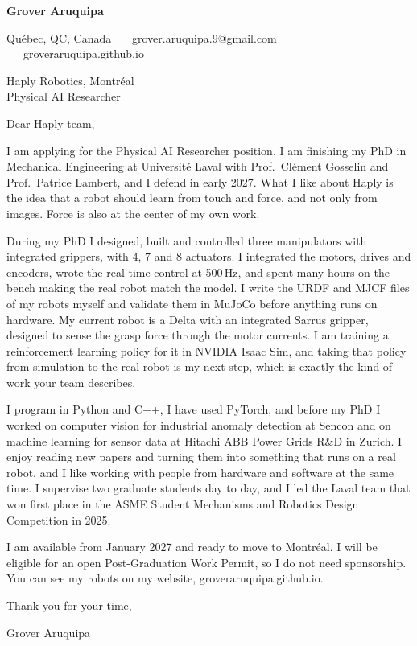 \documentclass[11pt,letterpaper]{article}
\begin{document}
{\large\bfseries Grover Aruquipa}\par\vspace{-6pt}
{\small Qu\'ebec, QC, Canada \ \textbullet\ \ grover.aruquipa.9@gmail.com \ \textbullet\ \ groveraruquipa.github.io}

\vspace{4pt}
Haply Robotics, Montr\'eal\\
Physical AI Researcher

Dear Haply team,

I am applying for the Physical AI Researcher position. I am finishing my PhD in Mechanical Engineering at Universit\'e Laval with Prof.\ Cl\'ement Gosselin and Prof.\ Patrice Lambert, and I defend in early 2027. What I like about Haply is the idea that a robot should learn from touch and force, and not only from images. Force is also at the center of my own work.

During my PhD I designed, built and controlled three manipulators with integrated grippers, with 4, 7 and 8 actuators. I integrated the motors, drives and encoders, wrote the real-time control at 500\,Hz, and spent many hours on the bench making the real robot match the model. I write the URDF and MJCF files of my robots myself and validate them in MuJoCo before anything runs on hardware. My current robot is a Delta with an integrated Sarrus gripper, designed to sense the grasp force through the motor currents. I am training a reinforcement learning policy for it in NVIDIA Isaac Sim, and taking that policy from simulation to the real robot is my next step, which is exactly the kind of work your team describes.

I program in Python and C++, I have used PyTorch, and before my PhD I worked on computer vision for industrial anomaly detection at Sencon and on machine learning for sensor data at Hitachi ABB Power Grids R\&D in Zurich. I enjoy reading new papers and turning them into something that runs on a real robot, and I like working with people from hardware and software at the same time. I supervise two graduate students day to day, and I led the Laval team that won first place in the ASME Student Mechanisms and Robotics Design Competition in 2025.

I am available from January 2027 and ready to move to Montr\'eal. I will be eligible for an open Post-Graduation Work Permit, so I do not need sponsorship. You can see my robots on my website, groveraruquipa.github.io.

Thank you for your time,

Grover Aruquipa
\end{document}
